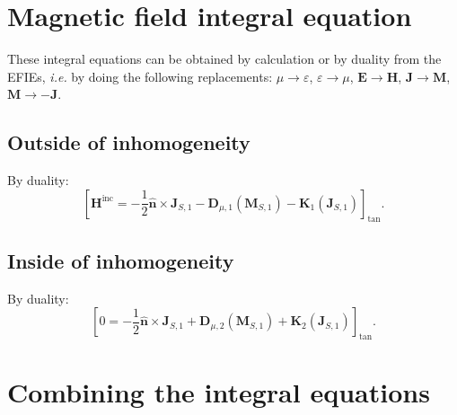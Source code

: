 \documentclass[a4paper,10pt]{book}
\newcommand{\field}[1]{\mathbf{#1}}
\newcommand{\current}[1]{\mathbf{#1}}
\newcommand{\vect}[1]{\mathbf{#1}}
\newcommand{\operator}[1]{\mathbf{#1}}
\begin{document}
\section{Magnetic field integral equation}
%
\par 
These integral equations can be obtained by calculation or by duality from the EFIEs, \textit{i.e.} by doing the following replacements: $\mu \rightarrow \varepsilon$, $\varepsilon \rightarrow \mu$, $\field{E} \rightarrow \field{H}$, $\current{J} \rightarrow \current{M}$, $\current{M} \rightarrow -\current{J}$.

\subsection{Outside of inhomogeneity}
%
\par
By duality:
\begin{equation}\label{eqn:HFIE_1}
\boxed{
\left[\field{H}^\text{inc} =  -\frac{1}{2}\vect{\hat{n}}\times \current{J}_{S,1} - \operator{D}_{\mu, 1}\left(\current{M}_{S,1}\right) - \operator{K}_{1}\left(\current{J}_{S,1}\right) \right]_\text{tan} }.
\end{equation}

\subsection{Inside of inhomogeneity}
%
\par
By duality:
\begin{equation}\label{eqn:HFIE_2}
\boxed{
\left[ 0 =  -\frac{1}{2}\vect{\hat{n}}\times \current{J}_{S,1} + \operator{D}_{\mu, 2}\left(\current{M}_{S,1}\right) + \operator{K}_{2}\left(\current{J}_{S,1}\right) \right]_\text{tan} }.
\end{equation}

\section{Combining the integral equations}
\end{document}
